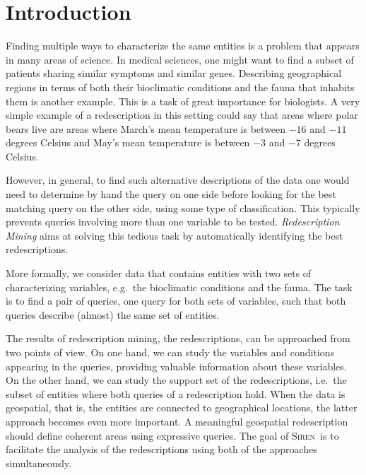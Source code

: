 \documentclass{sig-alternate}
\newcommand{\note}[1]{{\color{red}#1}}
\newcommand{\Siren}{\textsc{Siren}}
\begin{document}


\section{Introduction}
Finding multiple ways to characterize the same entities is a problem
that appears in many areas of science.  In medical sciences, one might
want to find a subset of patients sharing similar symptoms and similar
genes. Describing geographical regions in terms of both their
bioclimatic conditions and the fauna that inhabits them is another
example. This is a task of great importance for biologists.
 A very
simple example of a redescription in this setting could say that
areas where polar bears live are areas where March's mean temperature
is between $-16$ and $-11$ degrees Celsius and May's mean temperature
is between $-3$ and $-7$ degrees Celsius.

However, in general, to find such alternative descriptions of the data
one would need to determine by hand the query on one side before
looking for the best matching query on the other side, using some type
of classification. This typically prevents queries involving more than
one variable to be tested. \emph{Redescription Mining} aims at
solving this tedious task by automatically identifying the best
redescriptions.

More formally, we consider data that contains entities with two sets
of characterizing variables, e.g.\ the bioclimatic conditions and the
fauna. The task is to find a pair of queries, one query for both sets
of variables, such that both queries describe (almost) the same set of
entities.

The results of redescription mining, the redescriptions, can be
approached from two points of view. On one hand, we can study the
variables and conditions appearing in the queries, providing
valuable information about these variables. On the other hand, we can
study the support set of the redescriptions, i.e.\ the subset of
entities where both queries of a redescription hold. When the data
is geospatial, that is, the entities are connected to geographical locations, the
latter approach becomes even more important. A meaningful geospatial
redescription should define coherent areas using expressive
queries. The goal of \Siren\ is to facilitate the analysis of the
redescriptions using both of the approaches simultaneously.
\end{document}
